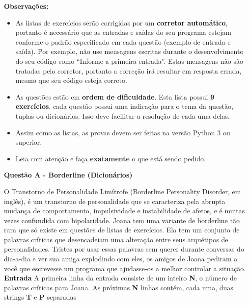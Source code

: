 \documentclass[a4paper, 12pt]{article}
\begin{document}
\textbf{{\large Observações:}}
\begin{itemize}
	\item As listas de exercícios serão corrigidas por um \textbf{corretor automático}, portanto é necessário que as entradas e saídas do seu programa estejam conforme o padrão especificado em cada questão (exemplo de entrada e saída). Por exemplo, não use mensagens escritas durante o desenvolvimento do seu código como ``Informe a primeira entrada''. Estas mensagens não são tratadas pelo corretor, portanto a correção irá resultar em resposta errada, mesmo que seu código esteja correto.
	\item As questões estão em \textbf{ordem de dificuldade}. Esta lista possui \textbf{9 exercícios}, cada questão possui uma indicação para o tema da questão, tuplas ou dicionários. Isso deve facilitar a resolução de cada uma delas.
	\item Assim como as listas, as provas devem ser feitas na versão Python 3 ou superior.
	\item Leia com atenção e faça \textbf{exatamente} o que está sendo pedido.
\end{itemize}
\newpage %
\begin{center}
\textbf{{\Large Questão A - Borderline (Dicionários)}}
\end{center}
\vspace{5pt}
O Transtorno de Personalidade Limítrofe (Borderline Personality Disorder, em
inglês), é um transtorno de personalidade que se caracteriza pela abrupta
mudança de comportamento, impulsividade e instabilidade de afetos, e é muitas
vezes confundida com bipolaridade. \newline \newline
Joana tem uma variante de borderline tão rara que só existe em questões de listas
de exercícios. Ela tem um conjunto de palavras críticas que desencadeiam uma
alteração entre seus arquétipos de personalidades. \newline \newline
Tristes por usar essas palavras sem querer durante conversas do dia-a-dia e ver
sua amiga explodindo com eles, os amigos de Joana pediram a você que
escrevesse um programa que ajudasse-os a melhor controlar a situação.
\newline \newline
\textbf{{\large Entrada}} \newline
A primeira linha da entrada consiste de um inteiro \textbf{N}, o número de palavras críticas
para Joana. As próximas \textbf{N} linhas contém, cada uma, duas strings \textbf{T} e \textbf{P} separadas
\end{document}
